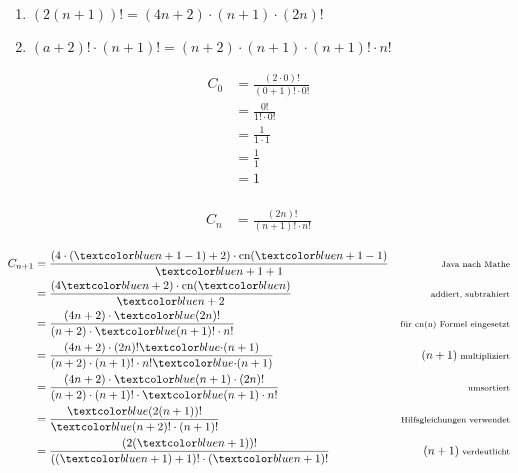 \documentclass{lehramt-informatik-aufgabe}
\begin{document}
\begin{enumerate}
\begin{enumerate}

\item $(2(n + 1))! = (4n + 2) \cdot (n + 1) \cdot (2n)!$

\item $(a + 2)! \cdot (n+1)! = (n + 2) \cdot (n + 1) \cdot (n + 1)! \cdot n!$
\end{enumerate}

\begin{liAntwort}
%

\liInduktionAnfang

\begin{align*}
C_0
& = \frac{(2 \cdot 0)!}{(0 + 1)! \cdot 0!}\\
& = \frac{0!}{1! \cdot 0!}\\
& = \frac{1}{1 \cdot 1}\\
& = \frac{1}{1}\\
& = 1\\
\end{align*}

%

\liInduktionVoraussetzung

\begin{align*}
C_n
& = \frac{(2n)!}{(n + 1)! \cdot n!}
\end{align*}

\newpage

%

\liInduktionSchritt


\begin{align*}
C_{n+1}
& = \frac
    {(4 \cdot (\m{n + 1} - 1) + 2) \cdot \text{cn}(\m{n + 1} - 1)}
    {\m{n + 1} + 1}
& \et{Java nach Mathe}\\
%
& = \frac
    {(4\m{n} + 2) \cdot \text{cn}(\m{n})}
    {\m{n + 2}}
& \et{addiert, subtrahiert}\\
%
& = \frac
    {(4n + 2) \cdot \m{(2n)!}}
    {(n + 2) \cdot \m{(n + 1)! \cdot n!}}
& \et{für cn(n) Formel eingesetzt}\\
%
& = \frac
    {(4n + 2) \cdot (2n)! \m{\cdot (n + 1)}}
    {(n + 2) \cdot (n + 1)! \cdot n! \m{\cdot (n + 1)}}
& \e{(n + 1) \text{ multipliziert}} \\
%
& = \frac
    {(4n + 2) \cdot \m{(n + 1) \cdot (2n)!}}
    {(n + 2) \cdot (n + 1)! \cdot \m{(n + 1) \cdot n!}}
& \et{umsortiert} \\
%
& = \frac
    {\m{(2(n + 1))!}}
    {\m{(n + 2)! \cdot (n + 1)!}}
& \et{Hilfsgleichungen verwendet}\\
%
& = \frac
    {(2(\m{n + 1}))!}
    {((\m{n + 1}) + 1)! \cdot (\m{n + 1})!}
& \e{(n + 1) \text{ verdeutlicht}}\\
\end{align*}


\end{liAntwort}
\end{enumerate}
\end{document}
